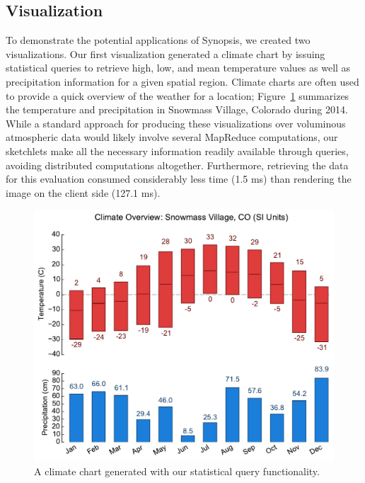 \subsection{Visualization}
To demonstrate the potential applications of Synopsis, we created two visualizations. Our first visualization generated a climate chart by issuing statistical queries to retrieve high, low, and mean temperature values as well as precipitation information for a given spatial region. Climate charts are often used to provide a quick overview of the weather for a location; Figure~\ref{fig:climate} summarizes the temperature and precipitation in Snowmass Village, Colorado during 2014. While a standard approach for producing these visualizations over voluminous atmospheric data would likely involve several MapReduce computations, our sketchlets make all the necessary information readily available through queries, avoiding distributed computations altogether. Furthermore, retrieving the data for this evaluation consumed considerably less time (1.5 ms) than rendering the image on the client side (127.1 ms).

\begin{figure}[h]
    \centerline{\includegraphics[width=\linewidth]{figures/climate-snowmass.pdf}}
    \caption{A climate chart generated with our statistical query functionality.}
    \label{fig:climate}
\end{figure}

